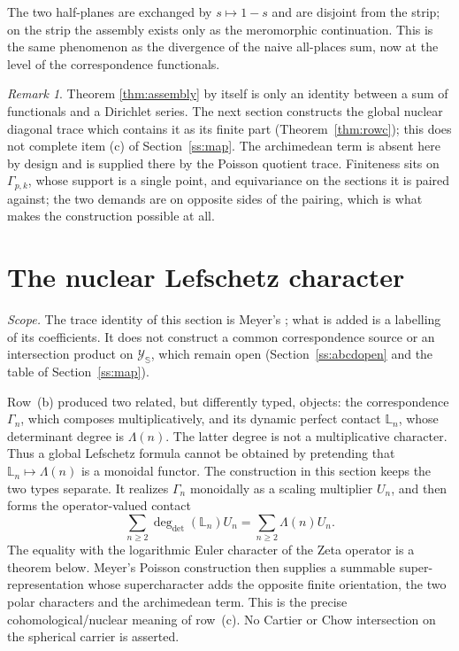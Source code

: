 \documentclass[11pt]{amsart}
\theoremstyle{definition}
\theoremstyle{remark}
\newtheorem{remark}[theorem]{Remark}
\begin{document}
The two half-planes are exchanged by $s\mapsto1-s$ and are disjoint from the
strip; on the strip the assembly exists only as the meromorphic
continuation.  This is the same phenomenon as the divergence of the naive
all-places sum, now at the level of the correspondence functionals.

\begin{remark}
Theorem \ref{thm:assembly} by itself is only an identity between a sum of
functionals and a Dirichlet series.  The next section constructs the global
nuclear diagonal trace which contains it as its finite part (Theorem~\ref{thm:rowc}); this does not complete item (c) of Section~\ref{ss:map}.  The archimedean term is
absent here by design and is supplied there by the Poisson quotient trace.
Finiteness sits on $\Gamma_{p,k}$, whose support is a single point, and
equivariance on the sections it is paired against; the two demands are on
opposite sides of the pairing, which is what makes the construction possible
at all.
\end{remark}


\section{The nuclear Lefschetz character}
\noindent\emph{Scope.} The trace identity of this section is Meyer's
\cite[Theorem~5.8]{MeyerZeta}; what is added is a labelling of its
coefficients.  It does not construct a common correspondence source or an
intersection product on $\mathscr Y_{\mathbb S}$, which remain open
(Section~\ref{ss:abcdopen} and the table of Section~\ref{ss:map}).

\label{sec:rowc}

Row~(b) produced two related, but differently typed, objects: the
correspondence $\Gamma_n$, which composes multiplicatively, and its dynamic
perfect contact $\mathbb L_n$, whose determinant degree is $\Lambda(n)$.
The latter degree is not a multiplicative character.  Thus a global
Lefschetz formula cannot be obtained by pretending that
$\mathbb L_n\mapsto\Lambda(n)$ is a monoidal functor.  The construction in
this section keeps the two types separate.  It realizes $\Gamma_n$
monoidally as a scaling multiplier $U_n$, and then forms the operator-valued
contact
\[
 \sum_{n\geq2}\deg_{\det}(\mathbb L_n)U_n
 =\sum_{n\geq2}\Lambda(n)U_n.
\]
The equality with the logarithmic Euler character of the Zeta operator is a
theorem below.  Meyer's Poisson construction then supplies a summable
super-representation whose supercharacter adds the opposite finite
orientation, the two polar characters and the archimedean term.  This is
the precise cohomological/nuclear meaning of row~(c).  No Cartier or Chow
intersection on the spherical carrier is asserted.
\end{document}
